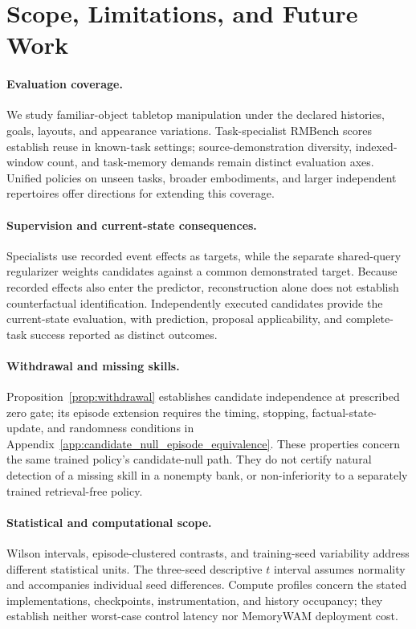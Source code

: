 \section{Scope, Limitations, and Future Work}
\label{app:scope}
\paragraph{Evaluation coverage.}
We study familiar-object tabletop manipulation under the declared histories, goals, layouts, and appearance variations.
Task-specialist RMBench scores establish reuse in known-task settings; source-demonstration diversity, indexed-window count, and task-memory demands remain distinct evaluation axes.
Unified policies on unseen tasks, broader embodiments, and larger independent repertoires offer directions for extending this coverage.

\paragraph{Supervision and current-state consequences.}
Specialists use recorded event effects as targets, while the separate shared-query regularizer weights candidates against a common demonstrated target.
Because recorded effects also enter the predictor, reconstruction alone does not establish counterfactual identification.
Independently executed candidates provide the current-state evaluation, with prediction, proposal applicability, and complete-task success reported as distinct outcomes.

\paragraph{Withdrawal and missing skills.}
Proposition~\ref{prop:withdrawal} establishes candidate independence at prescribed zero gate; its episode extension requires the timing, stopping, factual-state-update, and randomness conditions in Appendix~\ref{app:candidate_null_episode_equivalence}.
These properties concern the same trained policy's candidate-null path.
They do not certify natural detection of a missing skill in a nonempty bank, or non-inferiority to a separately trained retrieval-free policy.

\paragraph{Statistical and computational scope.}
Wilson intervals, episode-clustered contrasts, and training-seed variability address different statistical units.
The three-seed descriptive $t$ interval assumes normality and accompanies individual seed differences.
Compute profiles concern the stated implementations, checkpoints, instrumentation, and history occupancy; they establish neither worst-case control latency nor MemoryWAM deployment cost.

